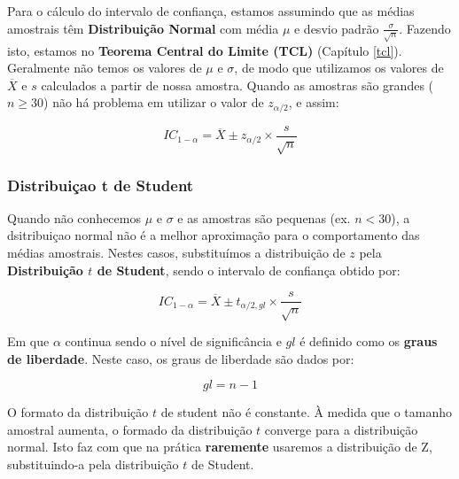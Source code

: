 \documentclass[
]{book}
\begin{document}
Para o cálculo do intervalo de confiança, estamos assumindo que as médias amostrais têm \textbf{Distribuição Normal} com média \(\mu\) e desvio padrão \(\frac{\sigma}{\sqrt{n}}\). Fazendo isto, estamos no \textbf{Teorema Central do Limite (TCL)} (Capítulo \ref{tcl}). Geralmente não temos os valores de \(\mu\) e \(\sigma\), de modo que utilizamos os valores de \(\overline{X}\) e \(s\) calculados a partir de nossa amostra. Quando as amostras são grandes (\(n\ge{30}\)) não há problema em utilizar o valor de \(z_{\alpha/2}\), e assim:

\[IC_{1-\alpha} = \overline{X} \pm z_{\alpha/2} \times \frac{s}{\sqrt{n}}\]

\hypertarget{distribuiuxe7ao-t-de-student}{%
\subsubsection{Distribuiçao t de Student}\label{distribuiuxe7ao-t-de-student}}

Quando não conhecemos \(\mu\) e \(\sigma\) e as amostras são pequenas (ex. \(n<30\)), a dsitribuiçao normal não é a melhor aproximação para o comportamento das médias amostrais. Nestes casos, substituímos a distribuição de \(z\) pela \textbf{Distribuição \(t\) de Student}, sendo o intervalo de confiança obtido por:

\[IC_{1-\alpha} = \overline{X} \pm t_{\alpha/2, gl} \times \frac{s}{\sqrt{n}}\]

Em que \(\alpha\) continua sendo o nível de significância e \(gl\) é definido como os \textbf{graus de liberdade}. Neste caso, os graus de liberdade são dados por:

\[gl = n-1\]

O formato da distribuição \(t\) de student não é constante. À medida que o tamanho amostral aumenta, o formado da distribuição \(t\) converge para a distribuição normal. Isto faz com que na prática \textbf{raremente} usaremos a distribuição de Z, substituindo-a pela distribuição \(t\) de Student.
\end{document}
